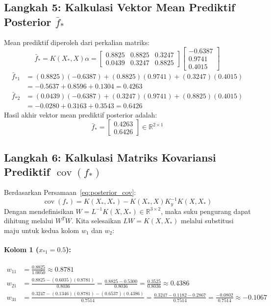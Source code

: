 \documentclass[11pt,a4paper]{article}
\def\boldsymbol#1{#1}%
\def\mathbf#1{#1}%
\begin{document}
\subsection{Langkah 5: Kalkulasi Vektor Mean Prediktif Posterior \texorpdfstring{$\bar{\mathbf{f}}_*$}{f*}}
Mean prediktif diperoleh dari perkalian matriks:
\begin{equation}
\bar{\mathbf{f}}_* = K(X_*, X) \boldsymbol{\alpha} = \begin{bmatrix}
0.8825 & 0.8825 & 0.3247 \\
0.0439 & 0.3247 & 0.8825
\end{bmatrix}
\begin{bmatrix}
-0.6387 \\ 0.9741 \\ 0.4015
\end{bmatrix}
\end{equation}
\begin{align*}
\bar{f}_{*1} &= (0.8825)(-0.6387) + (0.8825)(0.9741) + (0.3247)(0.4015) \\
&= -0.5637 + 0.8596 + 0.1304 = \mathbf{0.4263} \\
\bar{f}_{*2} &= (0.0439)(-0.6387) + (0.3247)(0.9741) + (0.8825)(0.4015) \\
&= -0.0280 + 0.3163 + 0.3543 = \mathbf{0.6426}
\end{align*}
Hasil akhir vektor mean prediktif posterior adalah:
\begin{equation}
\bar{\mathbf{f}}_* = \begin{bmatrix} 0.4263 \\ 0.6426 \end{bmatrix} \in \mathbb{R}^{2 \times 1}
\end{equation}

\subsection{Langkah 6: Kalkulasi Matriks Kovariansi Prediktif \texorpdfstring{$\operatorname{cov}(\mathbf{f}_*)$}{cov(f*)}}
Berdasarkan Persamaan~\eqref{eq:posterior_cov}:
\begin{equation}
\operatorname{cov}(\mathbf{f}_*) = K(X_*, X_*) - K(X_*, X) K_y^{-1} K(X, X_*)
\end{equation}
Dengan mendefinisikan $W = L^{-1} K(X, X_*) \in \mathbb{R}^{3 \times 2}$, maka suku pengurang dapat dihitung melalui $W^T W$. Kita selesaikan $L W = K(X, X_*)$ melalui substitusi maju untuk kedua kolom $\mathbf{w}_1$ dan $\mathbf{w}_2$:

\paragraph{Kolom 1 ($x_{*1} = 0.5$):}
\begin{align*}
w_{11} &= \frac{0.8825}{1.0050} \approx \mathbf{0.8781} \\
w_{21} &= \frac{0.8825 - (0.6035)(0.8781)}{0.8036} = \frac{0.8825 - 0.5300}{0.8036} = \frac{0.3525}{0.8036} \approx \mathbf{0.4386} \\
w_{31} &= \frac{0.3247 - (0.1346)(0.8781) - (0.6537)(0.4386)}{0.7514} = \frac{0.3247 - 0.1182 - 0.2867}{0.7514} = \frac{-0.0802}{0.7514} \approx \mathbf{-0.1067}
\end{align*}
\end{document}
